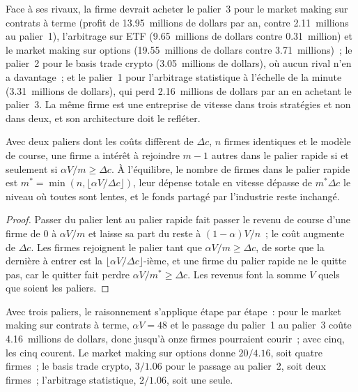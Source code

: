 Face à ses rivaux, la firme devrait acheter le palier~3 pour le market making sur contrats à terme (profit de 13.95~millions de dollars par an, contre 2.11~millions au palier~1), l'arbitrage sur ETF
(9.65~millions de dollars contre 0.31~million) et le market making sur options (19.55~millions de dollars contre 3.71~millions)~; le palier~2 pour le basis trade crypto
(3.05~millions de dollars), où aucun rival n'en a davantage~; et le palier~1 pour l'arbitrage statistique à l'échelle de la minute (3.31~millions de dollars), qui perd 2.16~millions de dollars par an
en achetant le palier~3. La même firme est une entreprise de vitesse dans trois stratégies et non dans deux, et son architecture doit le refléter.

\begin{proposition}\label{prop:fm:technology-strategy:count}
Avec deux paliers dont les coûts diffèrent de $\Delta c$, $n$ firmes identiques et le modèle de course, une firme a intérêt à rejoindre $m-1$ autres dans le palier rapide si
et seulement si $\alpha V/m\ge\Delta c$. À l'équilibre, le nombre de firmes dans le palier rapide est $m^*=\min(n,\lfloor\alpha V/\Delta c\rfloor)$, leur
dépense totale en vitesse dépasse de $m^*\Delta c$ le niveau où toutes sont lentes, et le fonds partagé par l'industrie reste inchangé.
\end{proposition}

\begin{proof}
Passer du palier lent au palier rapide fait passer le revenu de course d'une firme de 0 à $\alpha V/m$ et laisse sa part du reste à $(1-\alpha)V/n$~;
le coût augmente de $\Delta c$. Les firmes rejoignent le palier tant que $\alpha V/m\ge\Delta c$, de sorte que la dernière à entrer est la $\lfloor\alpha V/\Delta c\rfloor$-ième, et une firme
du palier rapide ne le quitte pas, car le quitter fait perdre $\alpha V/m^*\ge\Delta c$. Les revenus font la somme $V$ quels que soient les paliers.
\end{proof}

Avec trois paliers, le raisonnement s'applique étape par étape~: pour le market making sur contrats à terme, $\alpha V=48$ et le passage du palier~1 au palier~3 coûte 4.16~millions de dollars,
donc jusqu'à onze firmes pourraient courir~; avec cinq, les cinq courent. Le market making sur options donne $20/4.16$, soit quatre firmes~; le basis trade crypto, $3/1.06$ pour
le passage au palier~2, soit deux firmes~; l'arbitrage statistique, $2/1.06$, soit une seule.

